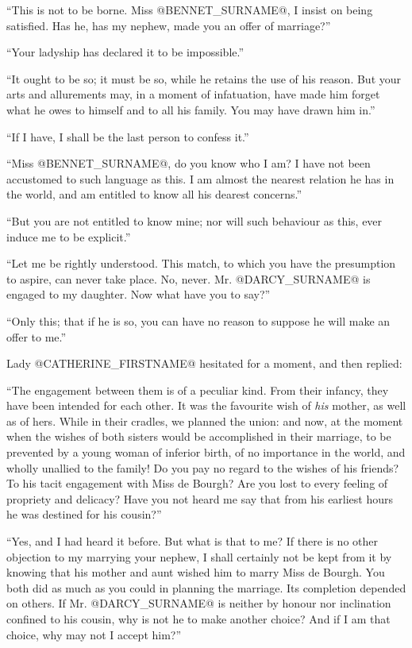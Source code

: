 ``This is not to be borne. Miss @BENNET_SURNAME@, I insist on being satisfied. Has
he, has my nephew, made you an offer of marriage?''

``Your ladyship has declared it to be impossible.''

``It ought to be so; it must be so, while he retains the use of his
reason. But your arts and allurements may, in a moment of infatuation,
have made him forget what he owes to himself and to all his family. You
may have drawn him in.''

``If I have, I shall be the last person to confess it.''

``Miss @BENNET_SURNAME@, do you know who I am? I have not been accustomed to such
language as this. I am almost the nearest relation he has in the world,
and am entitled to know all his dearest concerns.''

``But you are not entitled to know mine; nor will such behaviour as this,
ever induce me to be explicit.''

``Let me be rightly understood. This match, to which you have the
presumption to aspire, can never take place. No, never. Mr. @DARCY_SURNAME@ is
engaged to my daughter. Now what have you to say?''

``Only this; that if he is so, you can have no reason to suppose he will
make an offer to me.''

Lady @CATHERINE_FIRSTNAME@ hesitated for a moment, and then replied:

``The engagement between them is of a peculiar kind. From their infancy,
they have been intended for each other. It was the favourite wish of
\textit{his} mother, as well as of hers. While in their cradles, we planned
the union: and now, at the moment when the wishes of both sisters would
be accomplished in their marriage, to be prevented by a young woman of
inferior birth, of no importance in the world, and wholly unallied to
the family! Do you pay no regard to the wishes of his friends? To his
tacit engagement with Miss de Bourgh? Are you lost to every feeling of
propriety and delicacy? Have you not heard me say that from his earliest
hours he was destined for his cousin?''

``Yes, and I had heard it before. But what is that to me? If there is
no other objection to my marrying your nephew, I shall certainly not
be kept from it by knowing that his mother and aunt wished him to
marry Miss de Bourgh. You both did as much as you could in planning the
marriage. Its completion depended on others. If Mr. @DARCY_SURNAME@ is neither
by honour nor inclination confined to his cousin, why is not he to make
another choice? And if I am that choice, why may not I accept him?''

